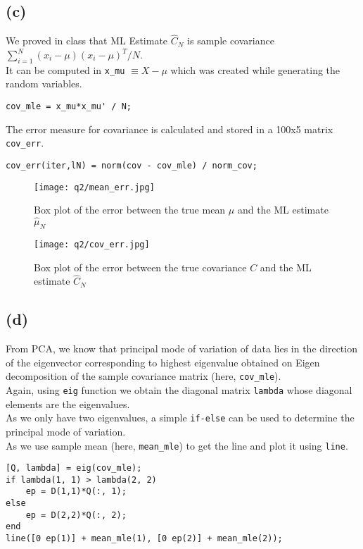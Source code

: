 \documentclass[11pt, fleqn]{article}
\begin{document}
\subsection*{(c)}
We proved in class that ML Estimate $\hat{C}_N$ is sample covariance $\sum_{i=1}^N (x_i - \mu) (x_i - \mu)^T / N$.\\
It can be computed in \verb!x_mu! $\equiv X - \mu$ which was created while generating the random variables.
\begin{verbatim}
cov_mle = x_mu*x_mu' / N;
\end{verbatim}
The error measure for covariance is calculated and stored in a 100x5 matrix \verb!cov_err!.
\begin{verbatim}
cov_err(iter,lN) = norm(cov - cov_mle) / norm_cov;
\end{verbatim}
\newpage
\begin{figure}[H]
    \centering
    \texttt{[image: q2/mean\_err.jpg]}
    \caption{Box plot of the error between the true mean $\mu$ and the ML estimate $\hat{\mu}_N$}
\end{figure}
\begin{figure}[H]
    \centering
    \texttt{[image: q2/cov\_err.jpg]}
    \caption{Box plot of the error between the true covariance $C$ and the ML estimate $\hat{C}_N$}
\end{figure}

\subsection*{(d)}
From PCA, we know that principal mode of variation of data lies in the direction of the eigenvector corresponding to highest eigenvalue obtained on Eigen decomposition of the sample covariance matrix (here, \verb!cov_mle!). \\
Again, using \verb!eig! function we obtain the diagonal matrix \verb!lambda! whose diagonal elements are the eigenvalues. \\
As we only have two eigenvalues, a simple \verb!if-else! can be used to determine the principal mode of variation. \\
As we use sample mean (here, \verb!mean_mle!) to get the line and plot it using \verb!line!.
\begin{verbatim}
[Q, lambda] = eig(cov_mle);
if lambda(1, 1) > lambda(2, 2)
    ep = D(1,1)*Q(:, 1);
else
    ep = D(2,2)*Q(:, 2);
end
line([0 ep(1)] + mean_mle(1), [0 ep(2)] + mean_mle(2));
\end{verbatim}
\end{document}
